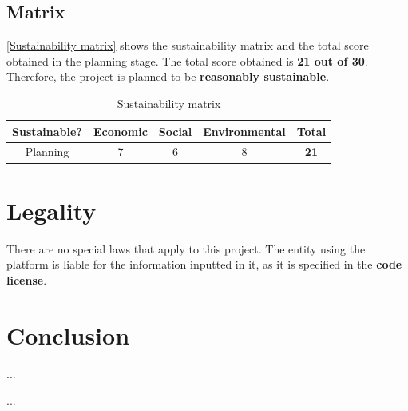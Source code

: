 \documentclass[a4paper,11pt,titlepage,abstract,numbers=noenddot,automark,mnsy,intlimits,rgb,dvipsnames]{report}
\begin{document}
\section{Matrix}
\autoref{Sustainability matrix} shows the sustainability matrix and the total score obtained in the planning
stage. The total score obtained is \textbf{21 out of 30}. Therefore, the project is planned to be \textbf{reasonably sustainable}.
\begin{table}[H]
\centering
\begin{tabular}{c | c | c | c | c}
\textbf{Sustainable?} & \textbf{Economic} & \textbf{Social} & \textbf{Environmental} & \textbf{Total}\\
\hline
Planning & 7 & 6 & 8 & \textbf{21}\\
\end{tabular}
\caption{Sustainability matrix}
\label{Sustainability matrix}
\end{table}
\clearpage
\chapter{Legality}
There are no special laws that apply to this project. The entity using the platform
is liable for the information inputted in it, as it is specified in the \textbf{code license}.
\clearpage
\chapter{Conclusion}
...
\clearpage


\begin{appendices}
...
\clearpage
\end{appendices}
\end{document}
